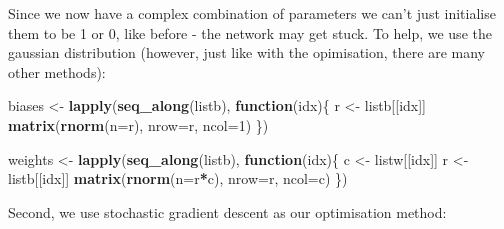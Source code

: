 \documentclass[]{book}
\newenvironment{Shaded}{\begin{snugshade}}{\end{snugshade}}
\newcommand{\ControlFlowTok}[1]{\textcolor[rgb]{0.13,0.29,0.53}{\textbf{#1}}}
\newcommand{\DataTypeTok}[1]{\textcolor[rgb]{0.13,0.29,0.53}{#1}}
\newcommand{\DecValTok}[1]{\textcolor[rgb]{0.00,0.00,0.81}{#1}}
\newcommand{\KeywordTok}[1]{\textcolor[rgb]{0.13,0.29,0.53}{\textbf{#1}}}
\newcommand{\NormalTok}[1]{#1}
\newcommand{\OperatorTok}[1]{\textcolor[rgb]{0.81,0.36,0.00}{\textbf{#1}}}
\newcommand{\StringTok}[1]{\textcolor[rgb]{0.31,0.60,0.02}{#1}}
\begin{document}
Since we now have a complex combination of parameters we can't just initialise them to be 1 or 0, like before - the network may get stuck. To help, we use the gaussian distribution (however, just like with the opimisation, there are many other methods):

\begin{Shaded}
\begin{Highlighting}[]
\NormalTok{    biases <-}\StringTok{ }\KeywordTok{lapply}\NormalTok{(}\KeywordTok{seq_along}\NormalTok{(listb), }\ControlFlowTok{function}\NormalTok{(idx)\{}
\NormalTok{    r <-}\StringTok{ }\NormalTok{listb[[idx]]}
    \KeywordTok{matrix}\NormalTok{(}\KeywordTok{rnorm}\NormalTok{(}\DataTypeTok{n=}\NormalTok{r), }\DataTypeTok{nrow=}\NormalTok{r, }\DataTypeTok{ncol=}\DecValTok{1}\NormalTok{)}
\NormalTok{    \})}

\NormalTok{    weights <-}\StringTok{ }\KeywordTok{lapply}\NormalTok{(}\KeywordTok{seq_along}\NormalTok{(listb), }\ControlFlowTok{function}\NormalTok{(idx)\{}
\NormalTok{    c <-}\StringTok{ }\NormalTok{listw[[idx]]}
\NormalTok{    r <-}\StringTok{ }\NormalTok{listb[[idx]]}
    \KeywordTok{matrix}\NormalTok{(}\KeywordTok{rnorm}\NormalTok{(}\DataTypeTok{n=}\NormalTok{r}\OperatorTok{*}\NormalTok{c), }\DataTypeTok{nrow=}\NormalTok{r, }\DataTypeTok{ncol=}\NormalTok{c)}
\NormalTok{    \})}
\end{Highlighting}
\end{Shaded}

Second, we use stochastic gradient descent as our optimisation method:
\end{document}
